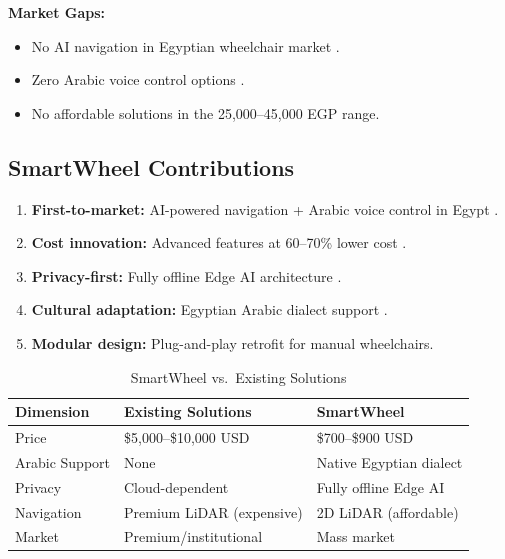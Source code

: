 \documentclass[12pt,a4paper]{report}
\begin{document}
\textbf{Market Gaps:}
\begin{itemize}
    \item No AI navigation in Egyptian wheelchair market \cite{idsc_egypt}.
    \item Zero Arabic voice control options \cite{grandview_market}.
    \item No affordable solutions in the 25,000--45,000 EGP range.
\end{itemize}

\subsection{SmartWheel Contributions}

\begin{enumerate}
    \item \textbf{First-to-market:} AI-powered navigation + Arabic voice control in Egypt \cite{elalfy_monocular,whisper}.
    \item \textbf{Cost innovation:} Advanced features at 60--70\% lower cost \cite{grandview_market}.
    \item \textbf{Privacy-first:} Fully offline Edge AI architecture \cite{egypt_law_151}.
    \item \textbf{Cultural adaptation:} Egyptian Arabic dialect support .
    \item \textbf{Modular design:} Plug-and-play retrofit for manual wheelchairs.
\end{enumerate}

\begin{table}[H]
\centering
\caption{SmartWheel vs.\ Existing Solutions}
\label{tab:smartwheel_advantages}
\begin{tabularx}{\textwidth}{@{}lXX@{}}
\toprule
\textbf{Dimension} & \textbf{Existing Solutions} & \textbf{SmartWheel} \\
\midrule
Price      & \$5,000--\$10,000 USD \cite{grandview_market} & \$700--\$900 USD \\
Arabic Support & None                  & Native Egyptian dialect  \\
Privacy    & Cloud-dependent          & Fully offline Edge AI \cite{egypt_law_151} \\
Navigation & Premium LiDAR (expensive) \cite{lidar_costs} & 2D LiDAR (affordable) \cite{elalfy_monocular} \\
Market     & Premium/institutional    & Mass market \\
\bottomrule
\end{tabularx}
\end{table}
\end{document}
